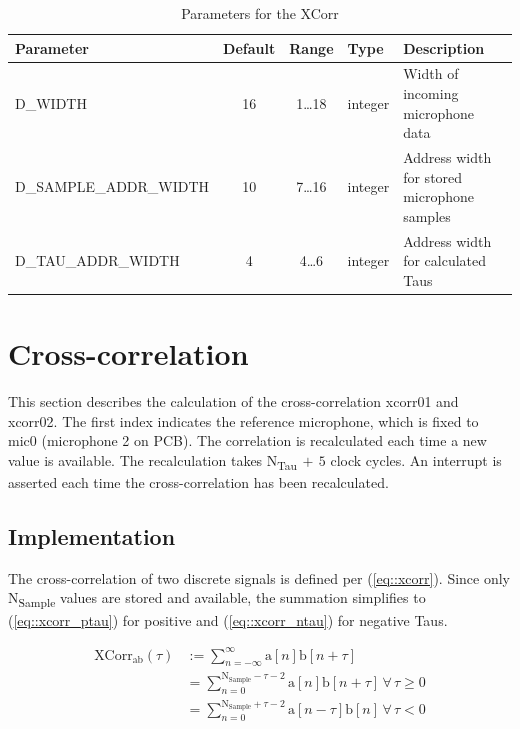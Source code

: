 \begin{table}[h]
	\centering
	\begin{tabular}{|l|c|c|l|l|}
		\hline 
		Parameter & Default & Range & Type & Description \\ 
		\hline 
		D\_WIDTH & 16 & 1\ldots18 & integer & Width of incoming microphone data\\
		\hline 
		D\_SAMPLE\_ADDR\_WIDTH & 10 & 7\ldots16 & integer & Address width for stored microphone samples\\
		\hline 
		D\_TAU\_ADDR\_WIDTH & 4 & 4\ldots6 & integer & Address width for calculated Taus \\
		\hline 
	\end{tabular} 
	\caption{Parameters for the XCorr}
	\label{tbl::parameters}
\end{table}

\section{Cross-correlation}
\label{sec::cic}

This section describes the calculation of the cross-correlation xcorr01 and xcorr02.
The first index indicates the reference microphone, which is fixed to mic0 (microphone 2 on PCB).
The correlation is recalculated each time a new value is available.
The recalculation takes N\textsubscript{Tau}$\,+\,5$ clock cycles.
An interrupt is asserted each time the cross-correlation has been recalculated.

\subsection{Implementation}

The cross-correlation of two discrete signals is defined per (\ref{eq::xcorr}).
Since only N\textsubscript{Sample} values are stored and available, the summation simplifies to (\ref{eq::xcorr_ptau}) for positive and  (\ref{eq::xcorr_ntau}) for negative Taus.

\begin{align}
\text{XCorr}_\text{ab}(\tau) &:= \sum_{n=-\infty}^{\infty}\text{a}\left[n\right]\text{b}\left[n+\tau\right] \label{eq::xcorr}\\
&= \sum_{n=0}^{\text{N}_\text{Sample}-\tau-2}\text{a}\left[n\right]\text{b}\left[n+\tau\right] \,\forall\,\tau\ge0 \label{eq::xcorr_ptau} \\
&= \sum_{n=0}^{\text{N}_\text{Sample}+\tau-2}\text{a}\left[n-\tau\right]\text{b}\left[n\right] \,\forall\,\tau<0 \label{eq::xcorr_ntau} \\	
\end{align}

